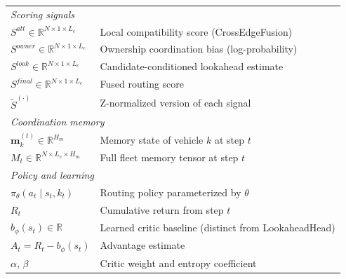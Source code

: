 \begin{table}[t]
{\begin{tabular}{ll}
\midrule
\multicolumn{2}{l}{\textit{Scoring signals}} \\
$S^{att}   \in \mathbb{R}^{N \times 1 \times L_c}$ & Local compatibility score (CrossEdgeFusion) \\
$S^{owner} \in \mathbb{R}^{N \times 1 \times L_c}$ & Ownership coordination bias (log-probability) \\
$S^{look}  \in \mathbb{R}^{N \times 1 \times L_c}$ & Candidate-conditioned lookahead estimate \\
$S^{final} \in \mathbb{R}^{N \times 1 \times L_c}$ & Fused routing score \\
$\tilde{S}^{(\cdot)}$                               & Z-normalized version of each signal \\

\midrule
\multicolumn{2}{l}{\textit{Coordination memory}} \\
$\mathbf{m}_k^{(t)} \in \mathbb{R}^{H_m}$    & Memory state of vehicle $k$ at step $t$ \\
$M_t \in \mathbb{R}^{N \times L_v \times H_m}$ & Full fleet memory tensor at step $t$ \\

\midrule
\multicolumn{2}{l}{\textit{Policy and learning}} \\
$\pi_\theta(a_t \mid s_t, k_t)$  & Routing policy parameterized by $\theta$ \\
$R_t$                            & Cumulative return from step $t$ \\
$b_\phi(s_t) \in \mathbb{R}$     & Learned critic baseline (distinct from LookaheadHead) \\
$A_t = R_t - b_\phi(s_t)$        & Advantage estimate \\
$\alpha,\,\beta$                 & Critic weight and entropy coefficient \\
\bottomrule
\end{tabular}}
\end{table}
